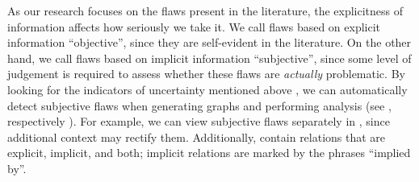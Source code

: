 
As our research focuses on the flaws present in the literature, the
explicitness of information affects how seriously we take it. We call flaws
based on explicit information ``objective'', since they are self-evident in
the literature. On the other hand, we call flaws based on implicit information
``subjective'', since some level of judgement is required to assess whether
these flaws are \emph{actually} problematic. By looking for
the indicators of uncertainty mentioned above \impKeywordsCode{}, we can
automatically detect subjective flaws when generating graphs and performing
analysis (see \ifnotpaper {}, respectively\else
    \fi).
For example, we can view subjective flaws separately in
, since additional context may rectify them.
\ifnotpaper Additionally, 
    contain relations that are explicit, implicit, and both; implicit relations
    are marked by the phrases ``implied by''. \fi

